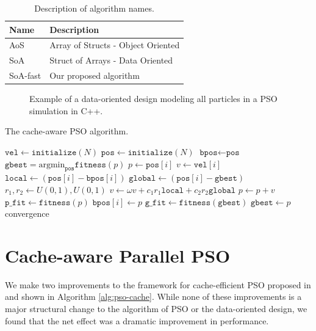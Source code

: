 \begin{table}
  \centering
  \caption{Description of algorithm names.}
  \label{tab:names}
  \begin{tabular}{ll}\toprule
    \textbf{Name} & \textbf{Description}\\\midrule
    AoS & Array of Structs - Object Oriented\\
    SoA & Struct of Arrays - Data Oriented\\
    SoA-fast & Our proposed algorithm\\\bottomrule
  \end{tabular}
\end{table}

          

\begin{figure}
  
  \caption{Example of a data-oriented design modeling all particles in a PSO
    simulation in C++.}\label{fig:particles}
\end{figure}

\begin{algorithm}
  \caption{The cache-aware PSO algorithm.}\label{alg:pso-cache}
  \begin{algorithmic}[1]
    \State $\texttt{vel} \gets \texttt{initialize}(N)$ 
    \State $\texttt{pos} \gets \texttt{initialize}(N)$ 
    \State $\texttt{bpos} \gets \texttt{pos}$ 
    \State $\texttt{gbest} = \text{argmin}_{\texttt{pos}}\texttt{fitness}(p)$
    \Repeat
    \State $p \gets \texttt{pos}[i]$
    \State $v \gets \texttt{vel}[i]$
    \State $\texttt{local} \gets (\texttt{pos}[i] -
    \texttt{bpos}[i])$
    \State $\texttt{global} \gets  (\texttt{pos}[i]
    - \texttt{gbest})$
    \State $r_1, r_2 \gets U(0, 1), U(0, 1)$
    \State $v \gets \omega v + c_1 r_1 \texttt{local}  + c_2 r_2 \texttt{global}$
    \State $p \gets p + v$
    \State $\texttt{p\_fit} \gets \texttt{fitness}(p)$
    \State $\texttt{bpos}[i] \gets p$
    \State $\texttt{g\_fit} \gets \texttt{fitness}(\texttt{gbest})$
      \State $\texttt{gbest} \gets p$
      \EndIf
    \EndIf
    \EndFor
    \Until convergence
    \EndProcedure
  \end{algorithmic}
\end{algorithm}

\section{Cache-aware Parallel PSO}\label{sec:algo}
We make two improvements to the framework for cache-efficient PSO proposed
in \cite{cache-pso} and shown in Algorithm \ref{alg:pso-cache}.
While none of these improvements is a major structural
change to the algorithm of PSO or the data-oriented design, we found that the
net effect was a dramatic improvement in performance.

